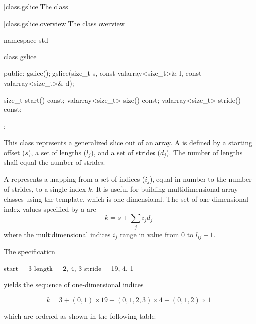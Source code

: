 [class.gslice]{The  class}

[class.gslice.overview]{The  class overview}

%
\begin{codeblock}
namespace std {
  class gslice {
  public:
    gslice();
    gslice(size_t s, const valarray<size_t>& l, const valarray<size_t>& d);

    size_t           start() const;
    valarray<size_t> size() const;
    valarray<size_t> stride() const;
  };
}
\end{codeblock}

\pnum
This class represents a generalized slice out of an array.
A
is defined by a starting offset ($s$),
a set of lengths ($l_j$),
and a set of strides ($d_j$).
The number of lengths shall equal the number of strides.

\pnum
A
represents a mapping from a set of indices ($i_j$),
equal in number to the number of strides, to a single index $k$.
It is useful for building multidimensional array classes using
the
template, which is one-dimensional.
The set of one-dimensional index values specified by a
are $$k = s + \sum_ji_jd_j$$
where the multidimensional indices $i_j$ range in value from
0 to $l_{ij} - 1$.

\pnum
\enterexample
The
specification
\begin{codeblock}
start  = 3
length = {2, 4, 3}
stride = {19, 4, 1}
\end{codeblock}
yields the sequence of one-dimensional indices

$$k = 3 + (0,1) \times 19 + (0,1,2,3) \times 4 + (0,1,2) \times 1$$

which are ordered as shown in the following table:

